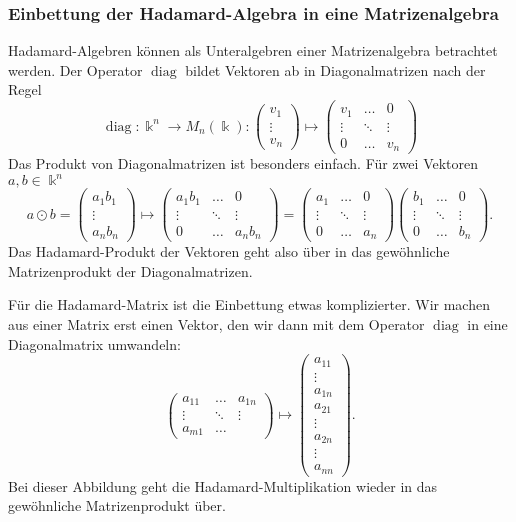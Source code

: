 \subsubsection{Einbettung der Hadamard-Algebra in eine Matrizenalgebra}
Hadamard-Algebren können als Unteralgebren einer Matrizenalgebra
betrachtet werden.
Der Operator $\operatorname{diag}$ bildet Vektoren ab in Diagonalmatrizen
nach der Regel
\[
\operatorname{diag}
\colon
\Bbbk^n \to M_n(\Bbbk)
:
\begin{pmatrix}
v_1\\
\vdots\\
v_n
\end{pmatrix}
\mapsto
\begin{pmatrix}
v_1&\dots&0\\
\vdots&\ddots&\vdots\\
0&\dots&v_n
\end{pmatrix}
\]
Das Produkt von Diagonalmatrizen ist besonders einfach.
Für zwei Vektoren $a,b\in\Bbbk^n$ 
\[
a\odot b
=
\begin{pmatrix}
a_1b_1\\
\vdots\\
a_nb_n
\end{pmatrix}
\mapsto
\begin{pmatrix}
a_1b_1&\dots&0\\
\vdots&\ddots&\vdots\\
0&\dots&a_nb_n
\end{pmatrix}
=
\begin{pmatrix}
a_1&\dots&0\\
\vdots&\ddots&\vdots\\
0&\dots&a_n
\end{pmatrix}
\begin{pmatrix}
b_1&\dots&0\\
\vdots&\ddots&\vdots\\
0&\dots&b_n
\end{pmatrix}.
\]
Das Hadamard-Produkt der Vektoren geht also über in das gewöhnliche
Matrizenprodukt der Diagonalmatrizen.

Für die Hadamard-Matrix ist die Einbettung etwas komplizierter.
Wir machen aus einer Matrix erst einen Vektor, den wir dann mit
dem Operator $\operatorname{diag}$ in eine Diagonalmatrix umwandeln:
\[
\begin{pmatrix}
a_{11}&\dots&a_{1n}\\
\vdots&\ddots&\vdots\\
a_{m1}&\dots
\end{pmatrix}
\mapsto
\begin{pmatrix}
a_{11}\\
\vdots\\
a_{1n}\\
a_{21}\\
\vdots\\
a_{2n}\\
\vdots\\
a_{nn}
\end{pmatrix}.
\]
Bei dieser Abbildung geht die Hadamard-Multiplikation wieder in
das gewöhnliche Matrizenprodukt über.

